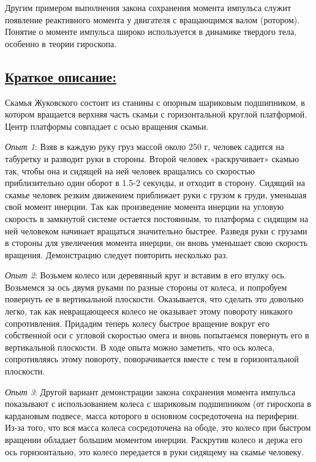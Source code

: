 \documentclass[14pt,a4paper,oneside]{extarticle}	%
\begin{document}
	Другим примером выполнения закона сохранения момента импульса служит появление реактивного момента у двигателя с вращающимся валом (ротором).
	Понятие о моменте импульса широко используется в динамике твердого тела, особенно в теории гироскопа.
		
	\subsection*{\underline{Краткое описание:}}
	
Скамья Жуковского состоит из станины с опорным шариковым подшипником, в котором вращается верхняя часть скамьи с горизонтальной круглой платформой.
Центр платформы совпадает с осью вращения скамьи.
		
	\textit{Опыт 1}:
Взяв в каждую руку груз массой около 250 г, человек садится на табуретку и разводит руки в стороны.
Второй человек «раскручивает» скамью так, чтобы она и сидящей на ней человек вращались со скоростью приблизительно один оборот в 1.5-2 секунды, и отходит в сторону. 
Сидящий на скамье человек резким движением приближает руки с грузом к груди, уменьшая свой момент инерции.
Так как произведение момента инерции на угловую скорость в замкнутой системе остается постоянным, то платформа с сидящим на ней человеком начинает вращаться значительно быстрее. 
Разведя руки с грузами в стороны для увеличения момента инерции, он вновь уменьшает свою скорость вращения.
Демонстрацию следует повторить несколько раз.

\textit{Опыт 2}:
Возьмем колесо или деревянный круг и вставим в его втулку ось.
Возьмемся за ось двумя руками по разные стороны от колеса, и попробуем повернуть ее в вертикальной плоскости.
Оказывается, что сделать это довольно легко, так как невращающееся колесо не оказывает этому повороту никакого сопротивления. Придадим теперь колесу быстрое вращение вокруг его собственной оси с угловой скоростью омега и вновь попытаемся повернуть его в вертикальной плоскости. В ходе опыта можно заметить, что ось колеса, сопротивляясь этому повороту, поворачивается вместе с тем в горизонтальной плоскости.

\textit{Опыт 3}: Другой вариант демонстрации закона сохранения момента импульса показывают с использованием колеса с шариковым подшипником (от гироскопа в кардановым подвесе, масса которого в основном сосредоточена на периферии. 
Из-за того, что вся масса колеса сосредоточена на ободе, это колесо при быстром вращении обладает большим моментом инерции.
Раскрутив колесо и держа его ось горизонтально, это колесо передается в руки сидящему на скамье человеку.
\end{document}
